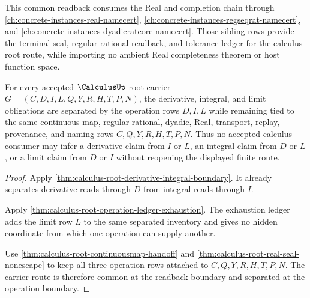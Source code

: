 This common readback consumes the Real and completion chain through \autoref{ch:concrete-instances-real-namecert}, \autoref{ch:concrete-instances-regseqrat-namecert}, and \autoref{ch:concrete-instances-dyadicratcore-namecert}. Those sibling rows provide the terminal seal, regular rational readback, and tolerance ledger for the calculus root route, while importing no ambient Real completeness theorem or host function space.

\begin{theorem}
\label{thm:calculus-root-operation-separation}
For every accepted $\CalculusUp$ root carrier $G=(C,D,I,L,Q,Y,R,H,T,P,N)$, the derivative, integral, and limit obligations are separated by the operation rows $D,I,L$ while remaining tied to the same continuous-map, regular-rational, dyadic, Real, transport, replay, provenance, and naming rows $C,Q,Y,R,H,T,P,N$. Thus no accepted calculus consumer may infer a derivative claim from $I$ or $L$, an integral claim from $D$ or $L$, or a limit claim from $D$ or $I$ without reopening the displayed finite route.
\end{theorem}
\begin{proof}
Apply \autoref{thm:calculus-root-derivative-integral-boundary}. It already separates derivative reads through $D$ from integral reads through $I$.

Apply \autoref{thm:calculus-root-operation-ledger-exhaustion}. The exhaustion ledger adds the limit row $L$ to the same separated inventory and gives no hidden coordinate from which one operation can supply another.

Use \autoref{thm:calculus-root-continuousmap-handoff} and \autoref{thm:calculus-root-real-seal-nonescape} to keep all three operation rows attached to $C,Q,Y,R,H,T,P,N$. The carrier route is therefore common at the readback boundary and separated at the operation boundary.
\end{proof}


